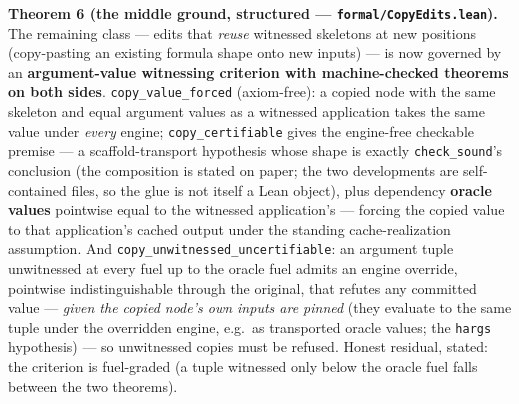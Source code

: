 \documentclass[
  11pt,
]{article}
\begin{document}
\textbf{Theorem 6 (the middle ground, structured ---
\texttt{formal/CopyEdits.lean}).} The remaining class --- edits that
\emph{reuse} witnessed skeletons at new positions (copy-pasting an
existing formula shape onto new inputs) --- is now governed by an
\textbf{argument-value witnessing criterion with machine-checked
theorems on both sides}. \texttt{copy\_value\_forced} (axiom-free): a
copied node with the same skeleton and equal argument values as a
witnessed application takes the same value under \emph{every} engine;
\texttt{copy\_certifiable} gives the engine-free checkable premise --- a
scaffold-transport hypothesis whose shape is exactly
\texttt{check\_sound}'s conclusion (the composition is stated on paper;
the two developments are self-contained files, so the glue is not itself
a Lean object), plus dependency \textbf{oracle values} pointwise equal
to the witnessed application's --- forcing the copied value to that
application's cached output under the standing cache-realization
assumption. And \texttt{copy\_unwitnessed\_uncertifiable}: an argument
tuple unwitnessed at every fuel up to the oracle fuel admits an engine
override, pointwise indistinguishable through the original, that refutes
any committed value --- \emph{given the copied node's own inputs are
pinned} (they evaluate to the same tuple under the overridden engine,
e.g.~as transported oracle values; the \texttt{hargs} hypothesis) --- so
unwitnessed copies must be refused. Honest residual, stated: the
criterion is fuel-graded (a tuple witnessed only below the oracle fuel
falls between the two theorems).
\end{document}
